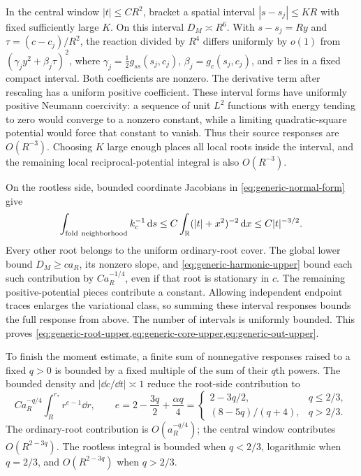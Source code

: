 In the central window $|t|\le CR^2$, bracket a spatial interval
$|s-s_j|\le KR$ with fixed sufficiently large $K$. On this interval
$D_M\asymp R^6$. With $s-s_j=Ry$ and $\tau=(c-c_j)/R^2$, the reaction
divided by $R^4$ differs uniformly by $o(1)$ from
$(\gamma_jy^2+\beta_j\tau)^2$, where
$\gamma_j=\tfrac12g_{ss}(s_j,c_j)$, $\beta_j=g_c(s_j,c_j)$, and
$\tau$ lies in a fixed compact interval. Both coefficients are nonzero.
The derivative term after rescaling has a uniform
positive coefficient. These interval forms have uniformly positive
Neumann coercivity: a sequence of unit $L^2$ functions with energy
tending to zero would converge to a nonzero constant, while a limiting
quadratic-square potential would force that constant to vanish.
Thus their source responses are $O(R^{-3})$. Choosing $K$ large
enough places all local roots inside the interval, and the remaining
local reciprocal-potential integral is also $O(R^{-3})$.

On the rootless side, bounded coordinate Jacobians in
\eqref{eq:generic-normal-form} give
\[
 \int_{\mathrm{fold\ neighborhood}}k_c^{-1}\dd s
 \le C\int_{\R}(|t|+x^2)^{-2}\dd x
 \le C|t|^{-3/2}.
\]
Every other root belongs to the uniform ordinary-root cover.
The global lower bound $D_M\ge ca_R$, its nonzero slope, and
\eqref{eq:generic-harmonic-upper} bound each such contribution by
$Ca_R^{-1/4}$, even if that root is stationary in $c$.
The remaining positive-potential pieces contribute a constant.
Allowing independent endpoint traces enlarges the variational class,
so summing these interval responses bounds the full response from
above. The number of intervals is uniformly bounded. This proves
\cref{eq:generic-root-upper,eq:generic-core-upper,eq:generic-out-upper}.

To finish the moment estimate, a finite sum of nonnegative responses
raised to a fixed $q>0$ is bounded by a fixed multiple of the sum of
their $q$th powers. The bounded density and $|\dd c/\dd t|\asymp1$
reduce the root-side contribution to
\begin{equation}\label{eq:generic-moment-integral}
 Ca_R^{-q/4}\int_R^{r_*}r^{e-1}\dd r,\qquad
 e=2-\frac{3q}{2}+\frac{\alpha q}{4}
 =\begin{cases}
 2-3q/2,&q\le2/3,\\
 (8-5q)/(q+4),&q>2/3.
 \end{cases}
\end{equation}
The ordinary-root contribution is $O(a_R^{-q/4})$; the central
window contributes $O(R^{2-3q})$. The rootless integral is bounded
when $q<2/3$, logarithmic when $q=2/3$, and $O(R^{2-3q})$ when
$q>2/3$.

